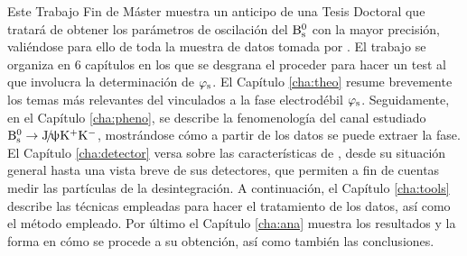 Este Trabajo Fin de Máster muestra un anticipo de una Tesis Doctoral que tratará de obtener los parámetros de oscilación del $\text{B}{}_{\text{s}}^{\text{0}}$ con la mayor precisión, valiéndose para ello de toda la muestra de datos tomada por \lhcb.
El trabajo se organiza en 6 capítulos en los que se desgrana el proceder para hacer un test al \stdmod que involucra la determinación de $\varphi_{\text{s}}$. 
El Capítulo \ref{cha:theo} resume brevemente los temas más relevantes del \stdmod vinculados a la fase electrodébil $\varphi_{\text{s}}$. 
Seguidamente, en el Capítulo \ref{cha:pheno}, se describe la fenomenología del canal estudiado $\text{B}{}_{\text{s}}^{\text{0}} \rightarrow \text{J}\!/\!\uppsi \text{K}{}^{+}\text{K}{}^{-}$, mostrándose cómo a partir de los datos se puede extraer la fase.
El Capítulo \ref{cha:detector} versa sobre las características de \lhcb, desde su situación general hasta una vista breve de sus detectores, que permiten a fin de cuentas medir las partículas de la desintegración.
A continuación, el Capítulo \ref{cha:tools} describe las técnicas empleadas para hacer el tratamiento de los datos, así como el método empleado.
Por último el Capítulo \ref{cha:ana} muestra los resultados y la forma en cómo se procede a su obtención, así como también las conclusiones. 
%


